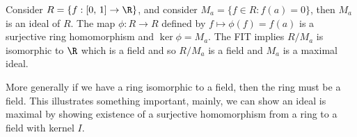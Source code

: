\begin{eg}
  Consider $R = \{f : [0,\,1] \to \R\}$, and consider $M_a = \{f \in R : f(a) = 0\}$, then $M_a$ is an ideal of $R$. The map $\phi : R \to R$ defined by $f \mapsto \phi(f) = f(a)$ is a surjective ring homomorphism and $\ker \phi = M_a$. The FIT implies $R/M_a$ is isomorphic to $\R$ which is a field and so $R/M_a$ is a field and $M_a$ is a maximal ideal.
\end{eg}

\noindent
More generally if we have a ring isomorphic to a field, then the ring must be a field. This illustrates something important, mainly, we can show an ideal is maximal by showing existence of a surjective homomorphism from a ring to a field with kernel $I$.